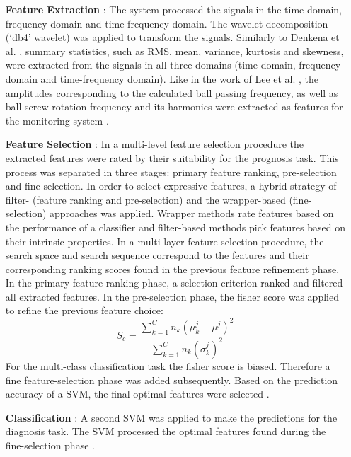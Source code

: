 \begin{itemize}
    \item [\textbf{Feature Extraction}]: The system processed the signals in the time domain, frequency domain and time-frequency domain. The wavelet decomposition (‘db4’ wavelet) was applied to transform the signals. Similarly to Denkena et al. \cite{Denkena2021}, summary statistics, such as RMS, mean, variance, kurtosis and skewness, were extracted from the signals in all three domains (time domain, frequency domain and time-frequency domain). Like in the work of Lee et al. \cite{Lee2015}, the amplitudes corresponding to the calculated ball passing frequency, as well as ball screw rotation frequency and its harmonics were extracted as features for the monitoring system \cite{LiPin2018}.
    \item [\textbf{Feature Selection}]: In a multi-level feature selection procedure the extracted features were rated by their suitability for the prognosis task. This process was separated in three stages: primary feature ranking, pre-selection and fine-selection. In order to select expressive features, a hybrid strategy of filter- (feature ranking and pre-selection) and the wrapper-based (fine-selection) approaches was applied. Wrapper methods rate features based on the performance of a classifier and filter-based methods pick features based on their intrinsic properties. In a multi-layer feature selection procedure, the search space and search sequence correspond to the features and their corresponding ranking scores found in the previous feature refinement phase. In the primary feature ranking phase, a selection criterion ranked and filtered all extracted features. In the pre-selection phase, the fisher score was applied to refine the previous feature choice:
    \begin{equation}
        S_{c} = \frac{\sum_{k=1}^{C} n_{k}(\mu_{k}^{j}-\mu^{j})^{2}}{\sum_{k=1}^{C}n_{k}(\sigma_{k}^{j})^{2}}
    \end{equation}
    For the multi-class classification task the fisher score is biased. Therefore a fine feature-selection phase was added subsequently. Based on the prediction accuracy of a SVM, the final optimal features were selected \cite{LiPin2018}.
    \item [\textbf{Classification}]: A second SVM was applied to make the predictions for the diagnosis task. The SVM processed the optimal features found during the fine-selection phase \cite{LiPin2018}. 
\end{itemize}

